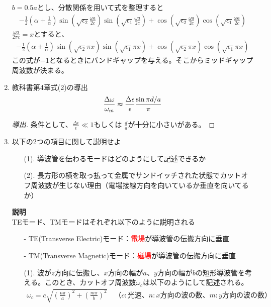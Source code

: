 \documentclass[a4paper,11pt,dvipdfmx]{jsarticle}
\begin{document}
\begin{enumerate}
  $b = 0.5a$とし、分散関係を用いて式を整理すると
  \begin{align*}
    - \frac{1}{2} \left( \alpha + \frac{1}{\alpha} \right) \sin \left( \sqrt{\epsilon_2} \frac{\omega a}{2 c} \right)\sin \left( \sqrt{\epsilon_1} \frac{\omega a}{2 c} \right) + \cos \left( \sqrt{\epsilon_2} \frac{\omega a}{2 c} \right)\cos \left( \sqrt{\epsilon_1} \frac{\omega a}{2 c} \right)
  \end{align*}
  $\displaystyle \frac{\omega a}{2 \pi c} = x$とすると、
  \begin{align*}
    - \frac{1}{2} \left( \alpha + \frac{1}{\alpha} \right) \sin \left( \sqrt{\epsilon_2} \pi x \right)\sin \left( \sqrt{\epsilon_1} \pi x \right) + \cos \left( \sqrt{\epsilon_2} \pi x \right)\cos \left( \sqrt{\epsilon_1} \pi x \right)
  \end{align*}
  この式が$-1$となるときにバンドギャップを与える。そこからミッドギャップ周波数が決まる。
  \item 教科書第4章式(2)の導出
  \begin{align*}
    \frac{\Delta \omega}{\omega_m} \thickapprox \frac{\Delta \epsilon}{\epsilon} \frac{\sin \pi d / a}{\pi}
  \end{align*}
  \begin{proof}[導出]
    条件として、$\displaystyle \frac{\Delta \epsilon}{\epsilon} \ll 1$もしくは $\displaystyle \frac{d}{a}$が十分に小さいがある。 
  \end{proof}
  \item 以下の2つの項目に関して説明せよ
  \begin{itemize}
    \item[(1).] 導波管を伝わるモードはどのようにして記述できるか
    \item[(2).] 長方形の横を取っ払って金属でサンドイッチされた状態でカットオフ周波数が生じない理由（電場接線方向を向いているか垂直を向いてるか）
  \end{itemize}
  \textbf{説明}
  \\
  TEモード、TMモードはそれぞれ以下のように説明される
    \begin{itemize}
      \item[-] TE(Transverse Electric)モード：\textcolor{red}{電場}が導波管の伝搬方向に垂直
      \item[-] TM(Transverse Magnetic)モード：\textcolor{red}{磁場}が導波管の伝搬方向に垂直
    \end{itemize}
  \begin{itemize}
    \item[(1).] 波が$z$方向に伝搬し、$x$方向の幅が$a$、$y$方向の幅が$b$の短形導波管を考える。このとき、カットオフ周波数$\omega_c$は以下のようにして記述される。
    \begin{align*}
      \omega_c = c \sqrt{\left( \frac{n \pi}{a} \right)^2 + \left( \frac{m \pi}{b} \right)^2} \quad （c:光速、 n: x方向の波の数、m:y方向の波の数）
    \end{align*}
    

\end{itemize}
\end{enumerate}
\end{document}
